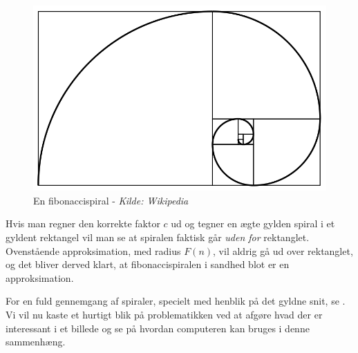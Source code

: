 {\begin{figure}[h!]
	\begin{center}
		\includegraphics[scale=0.35,angle=0]{afsnit/baggrund/billeder/Fibonacci_spiral}
	\end{center}
	\caption[En fibonaccispiral]{En fibonaccispiral - \emph{Kilde: Wikipedia}}
	\label{fibonacci_spiral}
\end{figure}
Hvis man regner den korrekte faktor $c$ ud og tegner en ægte gylden
spiral i et gyldent rektangel vil man se at spiralen faktisk går
\emph{uden for} rektanglet\cite{Sharp2002}. Ovenstående approksimation,
med radius $F(n)$, vil aldrig gå ud over rektanglet, og det bliver derved
klart, at fibonaccispiralen i sandhed blot er en approksimation.

For en fuld gennemgang af spiraler, specielt med henblik på det gyldne
snit, se \cite{Sharp2002}. Vi vil nu kaste et hurtigt blik på
problematikken ved at afgøre hvad der er interessant i et billede og se
på hvordan computeren kan bruges i denne sammenhæng.

}

